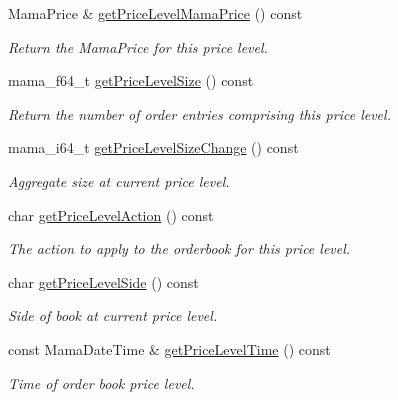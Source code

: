 \begin{CompactItemize}
Mama\-Price \& \hyperlink{classWombat_1_1MamdaBookAtomicListener_a71f90d4ad1c3297f35676b7a4363488}{get\-Price\-Level\-Mama\-Price} () const 
\begin{CompactList}\small\item\em Return the Mama\-Price for this price level. \item\end{CompactList}\item 
mama\_\-f64\_\-t \hyperlink{classWombat_1_1MamdaBookAtomicListener_9bb50db078f337545e39e94cfcb89f0e}{get\-Price\-Level\-Size} () const 
\begin{CompactList}\small\item\em Return the number of order entries comprising this price level. \item\end{CompactList}\item 
mama\_\-i64\_\-t \hyperlink{classWombat_1_1MamdaBookAtomicListener_f94e0c100149bd2543be4c5c5ae891a2}{get\-Price\-Level\-Size\-Change} () const 
\begin{CompactList}\small\item\em Aggregate size at current price level. \item\end{CompactList}\item 
char \hyperlink{classWombat_1_1MamdaBookAtomicListener_9bbc72a64bd32fba449ba581b369a980}{get\-Price\-Level\-Action} () const 
\begin{CompactList}\small\item\em The action to apply to the orderbook for this price level. \item\end{CompactList}\item 
char \hyperlink{classWombat_1_1MamdaBookAtomicListener_3031081549b1df511c872068f58e8ade}{get\-Price\-Level\-Side} () const 
\begin{CompactList}\small\item\em Side of book at current price level. \item\end{CompactList}\item 
const Mama\-Date\-Time \& \hyperlink{classWombat_1_1MamdaBookAtomicListener_85bb50891ec86cc8e1850b4097498a89}{get\-Price\-Level\-Time} () const 
\begin{CompactList}\small\item\em Time of order book price level. \item\end{CompactList}\item 

\end{CompactItemize}
